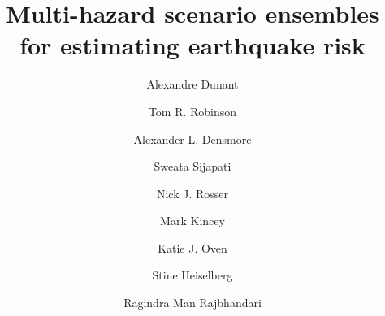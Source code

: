 \documentclass[preprint,12pt,authoryear]{elsarticle}
\begin{document}
\begin{frontmatter}

\title{Multi-hazard scenario ensembles for estimating earthquake risk}

\author[inst1,inst2]{Alexandre Dunant}
\author[inst3]{Tom R. Robinson}
\author[inst1]{Alexander L. Densmore}
\author[inst4]{Sweata Sijapati}
\author[inst1]{Nick J. Rosser}
\author[inst5]{Mark Kincey}
\author[inst6]{Katie J. Oven}
\author[inst7]{Stine Heiselberg}
\author[inst7]{Ragindra Man Rajbhandari}




\address[inst1]{Institute of Hazard, Risk, and Resilience and Department of Geography, Durham University, Durham, UK}
\address[inst2]{Center for Climate Change and Transformation, EURAC, Bolzano, Italy}
\address[inst3]{School of Earth and Environment, University of Canterbury, Christchurch, New Zealand}
\address[inst4]{National Society for Earthquake Technology, Kathmandu, Nepal}
\address[inst5]{School of Geography, Politics, and Sociology, Newcastle University, Newcastle, UK}
\address[inst6]{Department of Geography and Environmental Sciences, Northumbria University, Newcastle, UK}
\address[inst7]{UN Resident Coordinator's Office, Kathmandu, Nepal}


\end{frontmatter}
\end{document}
